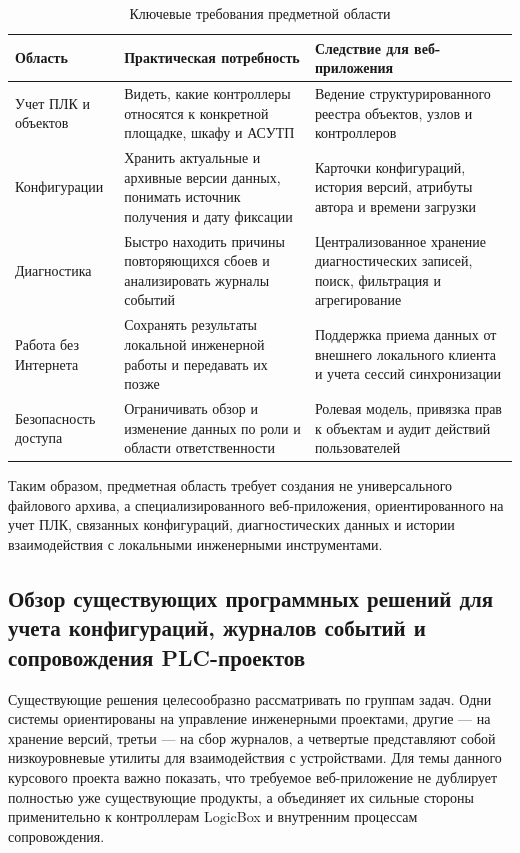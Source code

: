 \begin{table}[ht!]
    \centering
    \small
    \caption{Ключевые требования предметной области}
    \label{tab:domain_requirements}
    \begin{tabular}{|p{}|p{}|p{}|}
        \hline
        \textbf{Область} & \textbf{Практическая потребность} & \textbf{Следствие для веб-приложения} \\ \hline
        Учет ПЛК и объектов & Видеть, какие контроллеры относятся к конкретной площадке, шкафу и АСУТП & Ведение структурированного реестра объектов, узлов и контроллеров \\ \hline
        Конфигурации & Хранить актуальные и архивные версии данных, понимать источник получения и дату фиксации & Карточки конфигураций, история версий, атрибуты автора и времени загрузки \\ \hline
        Диагностика & Быстро находить причины повторяющихся сбоев и анализировать журналы событий & Централизованное хранение диагностических записей, поиск, фильтрация и агрегирование \\ \hline
        Работа без Интернета & Сохранять результаты локальной инженерной работы и передавать их позже & Поддержка приема данных от внешнего локального клиента и учета сессий синхронизации \\ \hline
        Безопасность доступа & Ограничивать обзор и изменение данных по роли и области ответственности & Ролевая модель, привязка прав к объектам и аудит действий пользователей \\ \hline
    \end{tabular}
    \normalsize
\end{table}

Таким образом, предметная область требует создания не универсального файлового
архива, а специализированного веб-приложения, ориентированного на учет ПЛК,
связанных конфигураций, диагностических данных и истории взаимодействия с
локальными инженерными инструментами.

\subsection{Обзор существующих программных решений для учета конфигураций, журналов событий и сопровождения PLC-проектов}

Существующие решения целесообразно рассматривать по группам задач. Одни системы
ориентированы на управление инженерными проектами, другие --- на хранение версий,
третьи --- на сбор журналов, а четвертые представляют собой низкоуровневые
утилиты для взаимодействия с устройствами. Для темы данного курсового проекта
важно показать, что требуемое веб-приложение не дублирует полностью уже
существующие продукты, а объединяет их сильные стороны применительно к
контроллерам LogicBox и внутренним процессам сопровождения.

